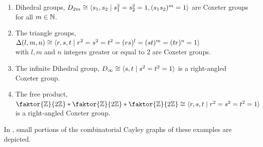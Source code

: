 \begin{example}
    \begin{enumerate}\label{ex:freeprod}
        \item Dihedral groups, \(D_{2m} \cong \langle s_1, s_2\;\vert\;s_1^2 = s_2^2 = 1, (s_1s_2)^m = 1\rangle\) are Coxeter groups for all \(m\in\mathbb{N}\).
        \item The triangle groups, \(\Delta(l,m,n) \cong \langle r,s,t\;\vert\;r^2 = s^2 = t^2 = (rs)^l = (st)^m = (tr)^n = 1\rangle\) \\
              with \(l, m\) and \(n\) integers greater or equal to \(2\) are Coxeter groups.
        \item The infinite Dihedral group, \(D_\infty \cong \langle s,t\;\vert\;s^2=t^2=1\rangle\) is a right-angled Coxeter group.
        \item The free product, \(\faktor{\Z}{2\Z}\ast\faktor{\Z}{2\Z}\ast\faktor{\Z}{2\Z} \cong \groupp{r,s,t}{r^2=s^2=t^2=1}\) is a right-angled Coxeter group.
    \end{enumerate}
\end{example}
\noindent
In , small portions of the combinatorial Cayley graphs of these examples are depicted.
\newpage

